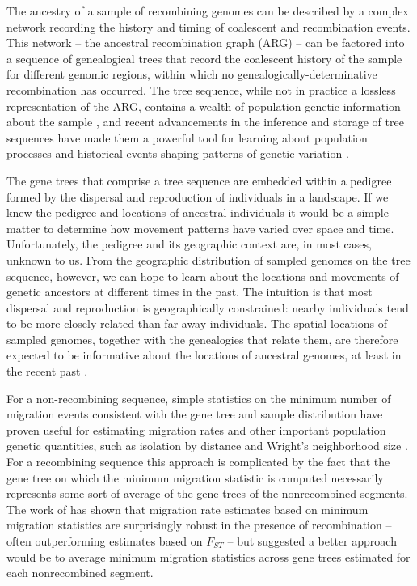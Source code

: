 The ancestry of a sample of recombining genomes can be described by a complex
network recording the history and timing of coalescent and recombination
events. This network -- the ancestral recombination graph (ARG) -- can be
factored into a sequence of genealogical trees that record the coalescent 
history of the sample for different genomic regions, within which no 
genealogically-determinative recombination has occurred. The tree sequence, 
while not in practice a lossless representation of the ARG, contains a wealth 
of population genetic information about the sample \cite{Ralph_etal_2020}, and
recent advancements in the inference and storage of tree sequences have made 
them a powerful tool for learning about population processes and historical 
events shaping patterns of genetic variation
\cite{Anderson-Trocme_etal_2023, Kelleher_etal_2016, Kelleher_etal_2019}.

The gene trees that comprise a tree sequence are embedded within a pedigree
formed by the dispersal and reproduction of individuals in a landscape. If we 
knew the pedigree and locations of ancestral individuals it would be a simple 
matter to determine how movement patterns have varied over space and time. 
Unfortunately, the pedigree and its geographic context are, in most cases, 
unknown to us. From the geographic distribution of sampled genomes on the tree
sequence, however, we can hope to learn about the locations and movements of 
genetic ancestors at different times in the past. The intuition is that most
dispersal and reproduction is geographically constrained: nearby individuals 
tend to be more closely related than far away individuals.  The spatial 
locations of sampled genomes, together with the genealogies that relate them, 
are therefore expected to be informative about the locations of ancestral 
genomes, at least in the recent past \cite{Wakeley_1999, Wilkins_2004}.

For a non-recombining sequence, simple statistics on the minimum number of
migration events consistent with the gene tree and sample distribution have
proven useful for estimating migration rates and other important population
genetic quantities, such as isolation by distance and Wright's neighborhood
size \cite{Slatkin_Maddison_1989, Slatkin_Maddison_1990}. For a recombining
sequence this approach is complicated by the fact that the gene tree on which
the minimum migration statistic is computed necessarily represents some sort of
average of the gene trees of the nonrecombined segments. The work of 
\cite{Hudson_etal_1992} has shown that migration rate estimates based on
minimum migration statistics are surprisingly robust in the presence of
recombination -- often outperforming estimates based on $F_{ST}$ -- but 
suggested a better approach would be to average minimum migration 
statistics across gene trees estimated for each nonrecombined segment.

